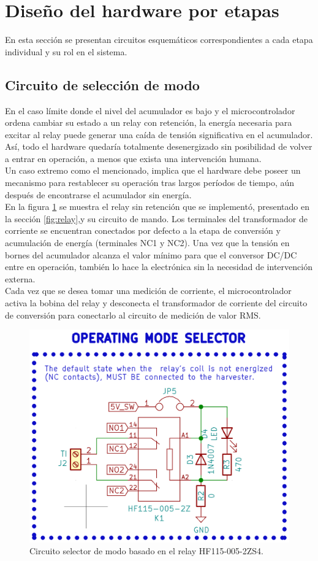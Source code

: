 \section{Diseño del hardware por etapas}\label{seccion_hardware}
En esta sección se presentan circuitos esquemáticos correspondientes a cada etapa individual y su rol en el sistema.
\subsection{Circuito de selección de modo}
En el caso límite donde el nivel del acumulador es bajo y el microcontrolador ordena cambiar su estado a un relay con retención, la energía necesaria para excitar al relay puede generar una caída de tensión significativa en el acumulador. As\'{i}, todo el hardware quedaría totalmente desenergizado sin posibilidad de volver a entrar en operación, a menos que exista una intervención humana.\\
Un caso extremo como el mencionado, implica que el hardware debe poseer un mecanismo para restablecer su operación tras largos per\'{i}odos de tiempo, a\'{u}n después de encontrarse el acumulador sin energ\'{i}a.\\
En la figura \ref{fig:ctoselecciondemodo} se muestra el relay sin retención que se implementó,  presentado en la secci\'{o}n \ref{fig:relay},y su circuito de mando. Los terminales del transformador de corriente se encuentran conectados por defecto a la etapa de conversión y acumulación de energía (terminales NC1 y NC2). Una vez que la tensión en bornes del acumulador alcanza el valor mínimo para que el conversor DC/DC entre en operación, también lo hace la electrónica sin la necesidad de intervención externa.\\
Cada vez que se desea tomar una medición de corriente, el microcontrolador activa la bobina del relay y desconecta el transformador de corriente del circuito de conversi\'{o}n para conectarlo al circuito de medición de valor RMS.\\
\begin{figure}[h]
	\centering
	\includegraphics[width=0.8\linewidth]{Figures/cto_seleccion_de_modo}
	\caption{Circuito selector de modo basado en el relay HF115-005-2ZS4.}
	\label{fig:ctoselecciondemodo}
\end{figure}\\

